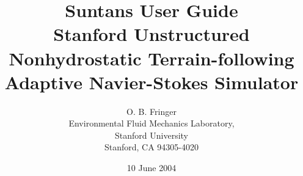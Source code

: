 \documentclass[12pt,oneside]{article}
\newif\ifpdf\ifx\pdfoutput\undefined\pdffalse\else\pdfoutput=1\pdftrue\fi
\newcommand{\pdfgraphics}{\ifpdf\DeclareGraphicsExtensions{.pdf,.jpg}\else\fi}
\begin{document}
\pdfgraphics

\title{Suntans User Guide\\
{\large Stanford Unstructured Nonhydrostatic 
Terrain-following Adaptive Navier-Stokes Simulator}}
\author{O. B. Fringer\\
\small
Environmental Fluid Mechanics Laboratory,  \\
Stanford University\\
Stanford, CA 94305-4020
\normalsize}
\date{10 June 2004}

\maketitle

\tableofcontents

\section{Downloading and installing Suntans}

In order to use Suntans, you must also install the message-passing
interface (MPI), the parallel graph partitioning libraries (ParMetis~\cite{PARMETIS[1998]}),
the grid generation package Triangle~\cite{TRIANGLE[1996]}.  Instructions for 
downloading and installing these packages are available from the individual websites
for each package:
\begin{tabbing}
MPI\hspace{0.5in}\=  \verb+http://www-unix.mcs.anl.gov/mpi/mpich/+\\
ParMetis \> \verb+http://www-users.cs.umn.edu/~karypis/metis/parmetis/+\\
Triangle \> \verb+http://www-2.cs.cmu.edu/~quake/triangle.html+
\end{tabbing}
Note that you must compile the triangle libraries as object files by making them
with \verb+make trilibrary+.

\subsection{Downloading and installing the latest source}
\end{document}
